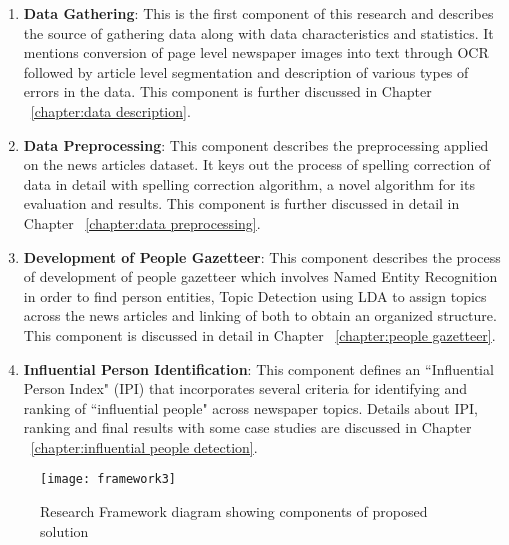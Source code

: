 \begin{enumerate}
\item \textbf {Data Gathering}:  
This is the first component of this research and describes the source of gathering data along with data characteristics and statistics. It mentions conversion of page level newspaper images into text through OCR followed by article level segmentation and description of various types of errors in the data. This component is further discussed in Chapter ~\ref{chapter:data description}.

\item \textbf {Data Preprocessing}:
This component describes the preprocessing applied on the news articles dataset. It keys out the process of spelling correction of data in detail with spelling correction algorithm, a novel algorithm for its evaluation and results. This component is further discussed in detail in Chapter ~\ref{chapter:data preprocessing}.

\item \textbf {Development of People Gazetteer}:
This component describes the process of development of people gazetteer which involves Named Entity Recognition in order to find person entities, Topic Detection using LDA to assign topics across the news articles and linking of both to obtain an organized structure. This component is discussed in detail in Chapter ~\ref{chapter:people gazetteer}.

\item \textbf {Influential Person Identification}:
This component defines an ``Influential Person Index" (IPI) that incorporates several criteria for identifying and ranking of ``influential people" across newspaper topics. Details about IPI, ranking and final results with some case studies are discussed in Chapter ~\ref{chapter:influential people detection}.

\end{enumerate}
 
\begin{figure}[h]
\centering
\texttt{[image: framework3]}
\caption{Research Framework diagram showing components of proposed solution}
\end{figure} 